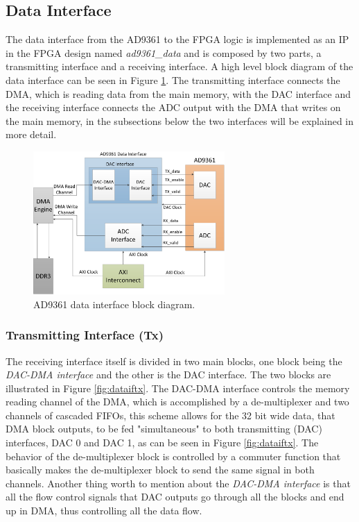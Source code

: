 \subsection{Data Interface}
\label{subs:dataif}

The data interface from the AD9361 to the FPGA logic is implemented as an IP in
the FPGA design named \emph{ad9361\_data} and is composed by two parts, a
transmitting interface and a receiving interface. A high level block diagram of
the data interface can be seen in Figure \ref{fig:databd}. The transmitting
interface connects the DMA, which is reading data from the main memory, with the
DAC interface and the receiving interface connects the ADC output with the DMA
that writes on the main memory, in the subsections below the two interfaces will
be explained in more detail.

\begin{figure}[htbp]
    \centering
    \includegraphics[width=0.65\textwidth]{./figures/data_if}
    \caption{ AD9361 data interface block diagram.
    \label{fig:databd}}
\end{figure}

\subsubsection{Transmitting Interface (Tx)}

The receiving interface itself is divided in two main blocks, one block being
the \emph{DAC-DMA interface} and the other is the DAC interface. The two blocks are
illustrated in Figure \ref{fig:dataiftx}. The DAC-DMA interface controls the
memory reading channel of the DMA, which is accomplished by a de-multiplexer
and two channels of cascaded FIFOs, this scheme allows for the 32 bit wide
data, that DMA block outputs, to be fed "simultaneous" to both transmitting
(DAC) interfaces, DAC 0 and DAC 1, as can be seen in Figure \ref{fig:dataiftx}.
The behavior of the de-multiplexer block is controlled by a commuter function
that basically makes the de-multiplexer block to send the same signal in both
channels. Another thing worth to mention about the \emph{DAC-DMA interface} is that
all the flow control signals that DAC outputs go through all the blocks and end
up in DMA, thus controlling all the data flow.

